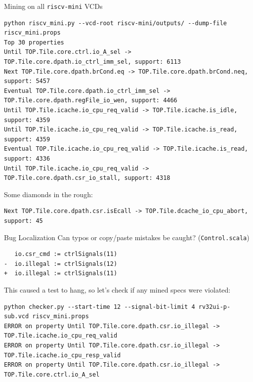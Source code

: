 \documentclass[12pt,aspectratio=169]{beamer}
\begin{document}
\begin{frame}[fragile]{Mining on all \texttt{riscv-mini} VCDs}
  \begin{verbatim}
python riscv_mini.py --vcd-root riscv-mini/outputs/ --dump-file riscv_mini.props
Top 30 properties
Until TOP.Tile.core.ctrl.io_A_sel -> TOP.Tile.core.dpath.io_ctrl_imm_sel, support: 6113
Next TOP.Tile.core.dpath.brCond.eq -> TOP.Tile.core.dpath.brCond.neq, support: 5457
Eventual TOP.Tile.core.dpath.io_ctrl_imm_sel -> TOP.Tile.core.dpath.regFile_io_wen, support: 4466
Until TOP.Tile.icache.io_cpu_req_valid -> TOP.Tile.icache.is_idle, support: 4359
Until TOP.Tile.icache.io_cpu_req_valid -> TOP.Tile.icache.is_read, support: 4359
Eventual TOP.Tile.icache.io_cpu_req_valid -> TOP.Tile.icache.is_read, support: 4336
Until TOP.Tile.icache.io_cpu_req_valid -> TOP.Tile.core.dpath.csr_io_stall, support: 4318
  \end{verbatim}

  Some diamonds in the rough:
  \begin{verbatim}
Next TOP.Tile.core.dpath.csr.isEcall -> TOP.Tile.dcache_io_cpu_abort, support: 45
  \end{verbatim}
\end{frame}

\begin{frame}[fragile]{Bug Localization}
  Can typos or copy/paste mistakes be caught? (\texttt{Control.scala})
  \begin{verbatim}
   io.csr_cmd := ctrlSignals(11)
-  io.illegal := ctrlSignals(12)
+  io.illegal := ctrlSignals(11)
  \end{verbatim}

  This caused a test to hang, so let's check if any mined specs were violated:
  \begin{verbatim}
python checker.py --start-time 12 --signal-bit-limit 4 rv32ui-p-sub.vcd riscv_mini.props
ERROR on property Until TOP.Tile.core.dpath.csr.io_illegal -> TOP.Tile.icache.io_cpu_req_valid
ERROR on property Until TOP.Tile.core.dpath.csr.io_illegal -> TOP.Tile.icache.io_cpu_resp_valid
ERROR on property Until TOP.Tile.core.dpath.csr.io_illegal -> TOP.Tile.core.ctrl.io_A_sel
  \end{verbatim}
\end{frame}
\end{document}
